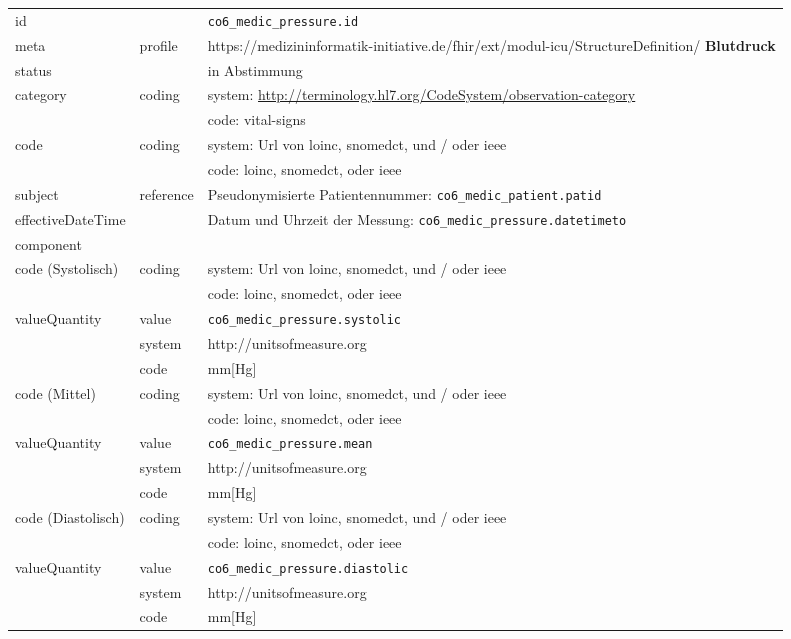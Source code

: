 \begin{longtable}{|l|l|p{7.5cm}|}
        \hline
        \rowcolor{lightgray} \multicolumn{3}{|l|}{Data Mapping (inhaltlich)} \\ \hline
        id &  & \texttt{co6\_medic\_pressure.id} \\ \hline
	meta & profile & https://medizininformatik-initiative.de/fhir/ext/modul-icu/StructureDefinition/\textbf{
Blutdruck} \\ \hline 
	status &  & in Abstimmung  \\ \hline 
	category & coding & system: \url{http://terminology.hl7.org/CodeSystem/observation-category} \\ 
\cline{3-3}
        & & code: vital-signs \\ \hline
        code & coding & system: Url von \ac{loinc}, \ac{snomedct}, und / oder \ac{ieee} \\
        \cline{3-3}
         &  & code: \ac{loinc}, \ac{snomedct}, oder \ac{ieee} \\ \hline
        subject & reference & Pseudonymisierte Patientennummer: \texttt{co6\_medic\_patient.patid} \\ \hline
        effectiveDateTime & & Datum und Uhrzeit der Messung:  \texttt{co6\_medic\_pressure.datetimeto} \\ \hline
	\multicolumn{3}{|l|}{component} \\ \hline
	code (Systolisch)  & coding & system: Url von \ac{loinc}, \ac{snomedct}, und / oder \ac{ieee} \\ 
	\cline{3-3} 
	&  & code: \ac{loinc}, \ac{snomedct}, oder \ac{ieee} \\ \hline	
	valueQuantity & value & \texttt{co6\_medic\_pressure.systolic} \\
	\cline{2-3}
	& system & http://unitsofmeasure.org \\ 
	\cline{2-3}
	& code & mm[Hg] \\ \hline
	code (Mittel)  & coding & system: Url von \ac{loinc}, \ac{snomedct}, und / oder \ac{ieee} \\ 
	\cline{3-3} 
	&  & code: \ac{loinc}, \ac{snomedct}, oder \ac{ieee} \\ \hline	
	valueQuantity & value & \texttt{co6\_medic\_pressure.mean} \\
	\cline{2-3}
	& system & http://unitsofmeasure.org \\ 
	\cline{2-3}
	& code &  mm[Hg] \\ \hline
	code (Diastolisch)  & coding & system: Url von \ac{loinc}, \ac{snomedct}, und / oder \ac{ieee} \\ 
	\cline{3-3} 
	&  & code: \ac{loinc}, \ac{snomedct}, oder \ac{ieee} \\ \hline	
	valueQuantity & value & \texttt{co6\_medic\_pressure.diastolic} \\
	\cline{2-3}
	& system & http://unitsofmeasure.org \\ 
	\cline{2-3}
	& code & mm[Hg] \\ \hline
\end{longtable}
